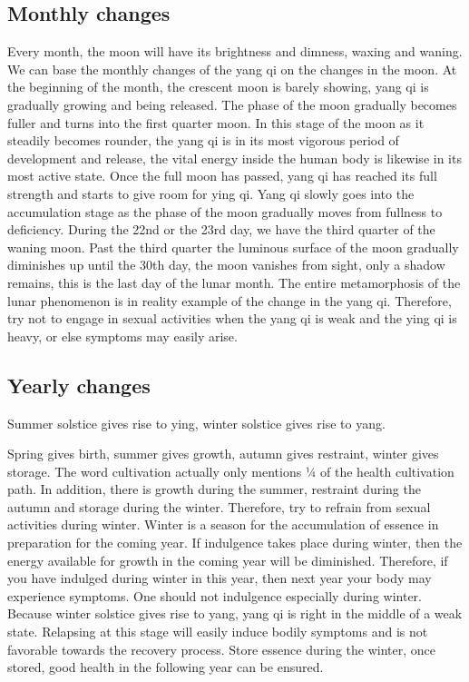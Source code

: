 \documentclass[
]{book}
\begin{document}
\hypertarget{monthly-changes}{%
\subsection{Monthly changes}\label{monthly-changes}}

Every month, the moon will have its brightness and dimness, waxing and waning. We can base the monthly changes of the yang qi on the changes in the moon. At the beginning of the month, the crescent moon is barely showing, yang qi is gradually growing and being released. The phase of the moon gradually becomes fuller and turns into the first quarter moon. In this stage of the moon as it steadily becomes rounder, the yang qi is in its most vigorous period of development and release, the vital energy inside the human body is likewise in its most active state. Once the full moon has passed, yang qi has reached its full strength and starts to give room for ying qi. Yang qi slowly goes into the accumulation stage as the phase of the moon gradually moves from fullness to deficiency. During the 22nd or the 23rd day, we have the third quarter of the waning moon. Past the third quarter the luminous surface of the moon gradually diminishes up until the 30th day, the moon vanishes from sight, only a shadow remains, this is the last day of the lunar month. The entire metamorphosis of the lunar phenomenon is in reality example of the change in the yang qi. Therefore, try not to engage in sexual activities when the yang qi is weak and the ying qi is heavy, or else symptoms may easily arise.

\hypertarget{yearly-changes}{%
\subsection{Yearly changes}\label{yearly-changes}}

Summer solstice gives rise to ying, winter solstice gives rise to yang.

Spring gives birth, summer gives growth, autumn gives restraint, winter gives storage. The word cultivation actually only mentions ¼ of the health cultivation path. In addition, there is growth during the summer, restraint during the autumn and storage during the winter. Therefore, try to refrain from sexual activities during winter. Winter is a season for the accumulation of essence in preparation for the coming year. If indulgence takes place during winter, then the energy available for growth in the coming year will be diminished. Therefore, if you have indulged during winter in this year, then next year your body may experience symptoms. One should not indulgence especially during winter. Because winter solstice gives rise to yang, yang qi is right in the middle of a weak state. Relapsing at this stage will easily induce bodily symptoms and is not favorable towards the recovery process. Store essence during the winter, once stored, good health in the following year can be ensured.
\end{document}
